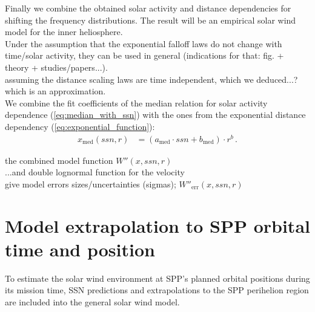 Finally we combine the obtained solar activity and distance dependencies for shifting the frequency distributions. The result will be an empirical solar wind model for the inner heliosphere.\\

Under the assumption that the exponential falloff laws do not change with time/solar activity, they can be used in general (indications for that: fig. + theory + studies/papers...).\\
assuming the distance scaling laws are time independent, which we deduced...? which is an approximation.\\


We combine the fit coefficients of the median relation for solar activity dependence (\ref{eq:median_with_ssn}) with the ones from the exponential distance dependency (\ref{eq:exponential_function}):
\begin{align}
	x_\text{med}(ssn,r) &= (a_\text{med} \cdot ssn + b_\text{med}) \cdot r^b\,.
\end{align}

the combined model function $W''(x,ssn,r)$\\

...and double lognormal function for the velocity\\

give model errors sizes/uncertainties (sigmas); $W''_\text{err}(x,ssn,r)$


\section{Model extrapolation to SPP orbital time and position}
To estimate the solar wind environment at SPP's planned orbital positions during its mission time, SSN predictions and extrapolations to the SPP perihelion region are included into the general solar wind model.\\

